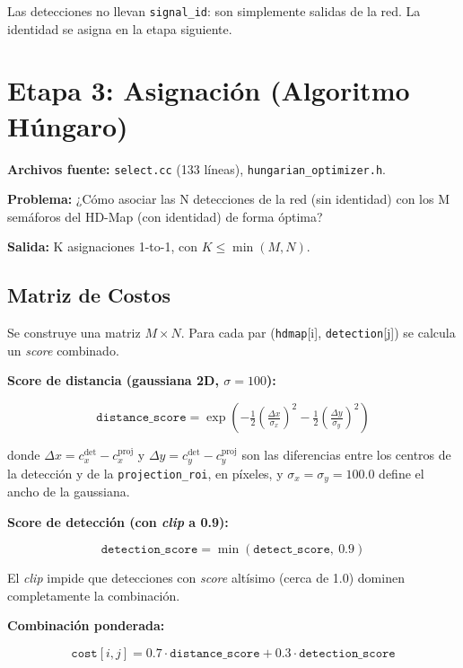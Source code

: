 Las detecciones no llevan \texttt{signal\_id}: son simplemente salidas de la red. La identidad se asigna en la etapa siguiente.

\section{Etapa 3: Asignación (Algoritmo Húngaro)}
\label{sec:funcionamiento_asignacion}

\textbf{Archivos fuente:} \texttt{select.cc} (133 líneas), \texttt{hungarian\_optimizer.h}.

\textbf{Problema:} ¿Cómo asociar las N detecciones de la red (sin identidad) con los M semáforos del HD-Map (con identidad) de forma óptima?

\textbf{Salida:} K asignaciones 1-to-1, con $K \le \min(M, N)$.

\subsection{Matriz de Costos}

Se construye una matriz $M \times N$. Para cada par (\texttt{hdmap}[i], \texttt{detection}[j]) se calcula un \textit{score} combinado.

\textbf{Score de distancia (gaussiana 2D, $\sigma = 100$):}

\begin{equation}
\texttt{distance\_score} = \exp\!\left(-\tfrac{1}{2}\left(\tfrac{\Delta x}{\sigma_x}\right)^2 - \tfrac{1}{2}\left(\tfrac{\Delta y}{\sigma_y}\right)^2\right)
\end{equation}

donde $\Delta x = c_x^{\text{det}} - c_x^{\text{proj}}$ y $\Delta y = c_y^{\text{det}} - c_y^{\text{proj}}$ son las diferencias entre los centros de la detección y de la \texttt{projection\_roi}, en píxeles, y $\sigma_x = \sigma_y = 100.0$ define el ancho de la gaussiana.

\textbf{Score de detección (con \textit{clip} a 0.9):}

\begin{equation}
\texttt{detection\_score} = \min(\texttt{detect\_score},\ 0.9)
\end{equation}

El \textit{clip} impide que detecciones con \textit{score} altísimo (cerca de 1.0) dominen completamente la combinación.

\textbf{Combinación ponderada:}

\begin{equation}
\texttt{cost}[i, j] = 0.7 \cdot \texttt{distance\_score} + 0.3 \cdot \texttt{detection\_score}
\end{equation}

